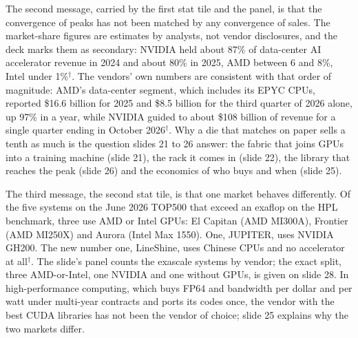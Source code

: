 \documentclass[11pt,letterpaper]{article}
\begin{document}
The second message, carried by the first stat tile and the panel, is that the convergence of peaks has not been matched by any convergence of sales. The market-share figures are estimates by analysts, not vendor disclosures, and the deck marks them as secondary: NVIDIA held about 87\% of data-center AI accelerator revenue in 2024 and about 80\% in 2025, AMD between 6 and 8\%, Intel under 1\%$^\dagger$. The vendors' own numbers are consistent with that order of magnitude: AMD's data-center segment, which includes its EPYC CPUs, reported \$16.6 billion for 2025 and \$8.5 billion for the third quarter of 2026 alone, up 97\% in a year, while NVIDIA guided to about \$108 billion of revenue for a single quarter ending in October 2026$^\dagger$. Why a die that matches on paper sells a tenth as much is the question slides 21 to 26 answer: the fabric that joins GPUs into a training machine (slide 21), the rack it comes in (slide 22), the library that reaches the peak (slide 26) and the economics of who buys and when (slide 25).

The third message, the second stat tile, is that one market behaves differently. Of the five systems on the June 2026 TOP500 that exceed an exaflop on the HPL benchmark, three use AMD or Intel GPUs: El Capitan (AMD MI300A), Frontier (AMD MI250X) and Aurora (Intel Max 1550). One, JUPITER, uses NVIDIA GH200. The new number one, LineShine, uses Chinese CPUs and no accelerator at all$^\dagger$. The slide's panel counts the exascale systems by vendor; the exact split, three AMD-or-Intel, one NVIDIA and one without GPUs, is given on slide 28. In high-performance computing, which buys FP64 and bandwidth per dollar and per watt under multi-year contracts and ports its codes once, the vendor with the best CUDA libraries has not been the vendor of choice; slide 25 explains why the two markets differ.
\end{document}
